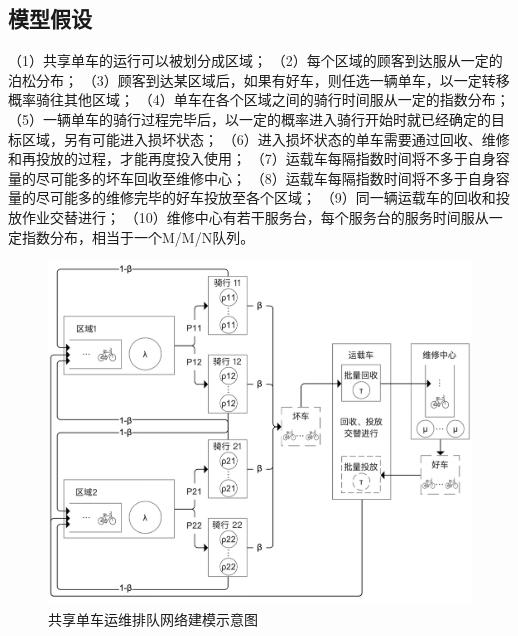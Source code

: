 \documentclass{article}
\begin{document}
\subsection{模型假设}
（1）共享单车的运行可以被划分成区域；
（2）每个区域的顾客到达服从一定的泊松分布；
（3）顾客到达某区域后，如果有好车，则任选一辆单车，以一定转移概率骑往其他区域；
（4）单车在各个区域之间的骑行时间服从一定的指数分布；
（5）一辆单车的骑行过程完毕后，以一定的概率进入骑行开始时就已经确定的目标区域，另有可能进入损坏状态；
（6）进入损坏状态的单车需要通过回收、维修和再投放的过程，才能再度投入使用；
（7）运载车每隔指数时间将不多于自身容量的尽可能多的坏车回收至维修中心；
（8）运载车每隔指数时间将不多于自身容量的尽可能多的维修完毕的好车投放至各个区域；
（9）同一辆运载车的回收和投放作业交替进行；
（10）维修中心有若干服务台，每个服务台的服务时间服从一定指数分布，相当于一个M/M/N队列。

\begin{figure}[H]
    \centering
    \includegraphics[scale=0.4]{./model/model.png}
    \caption{共享单车运维排队网络建模示意图}
    \label{fig:cenmodel}
\end{figure}
\end{document}
